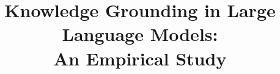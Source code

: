 \documentclass[conference]{IEEEtran}
\title{Knowledge Grounding in Large Language Models: \\ An Empirical Study}
\author{\IEEEauthorblockN{Anonymous Authors}}
\begin{document}
\maketitle{}

\begin{abstract}
	
\end{abstract}














% 


\end{document}

